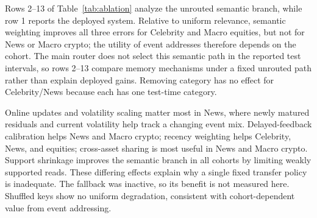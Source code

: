 Rows 2--13 of Table~\ref{tab:ablation} analyze the unrouted semantic branch, while row 1 reports the deployed system. Relative to uniform relevance, semantic weighting improves all three errors for Celebrity and Macro equities, but not for News or Macro crypto; the utility of event addresses therefore depends on the cohort. The main router does not select this semantic path in the reported test intervals, so rows 2--13 compare memory mechanisms under a fixed unrouted path rather than explain deployed gains. Removing category has no effect for Celebrity/News because each has one test-time category.

Online updates and volatility scaling matter most in News, where newly matured residuals and current volatility help track a changing event mix. Delayed-feedback calibration helps News and Macro crypto; recency weighting helps Celebrity, News, and equities; cross-asset sharing is most useful in News and Macro crypto. Support shrinkage improves the semantic branch in all cohorts by limiting weakly supported reads. These differing effects explain why a single fixed transfer policy is inadequate. The fallback was inactive, so its benefit is not measured here. Shuffled keys show no uniform degradation, consistent with cohort-dependent value from event addressing.
